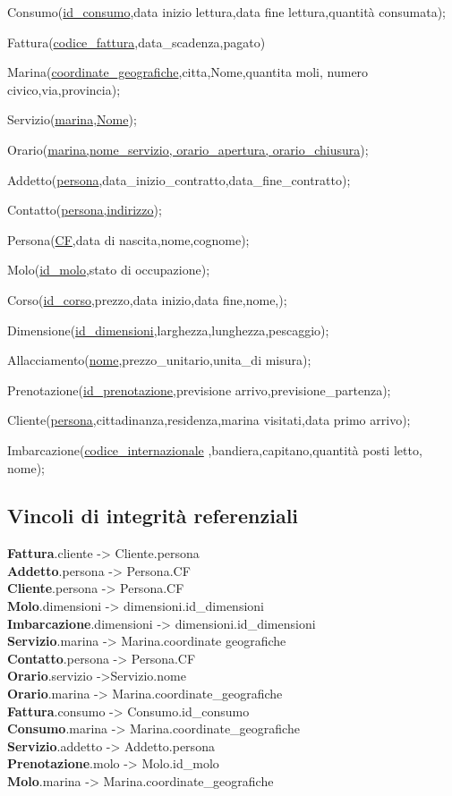 Consumo(\underline{id\_consumo},data inizio lettura,data fine lettura,quantità consumata);

Fattura(\underline{codice\_fattura},data\_scadenza,pagato) 

Marina(\underline{coordinate\_geografiche},citta,Nome,quantita moli, numero civico,via,provincia);

Servizio(\underline{marina,Nome});

Orario(\underline{marina,nome\_servizio, orario\_apertura, orario\_chiusura});

Addetto(\underline{persona},data\_inizio\_contratto,data\_fine\_contratto);

Contatto(\underline{persona,indirizzo});

Persona(\underline{CF},data di nascita,nome,cognome);

Molo(\underline{id\_molo},stato di occupazione);

Corso(\underline{id\_corso},prezzo,data inizio,data fine,nome,);

Dimensione(\underline{id\_dimensioni},larghezza,lunghezza,pescaggio);

Allacciamento(\underline{nome},prezzo\_unitario,unita\_di misura);

Prenotazione(\underline{id\_prenotazione},previsione arrivo,previsione\_partenza);

Cliente(\underline{persona},cittadinanza,residenza,marina visitati,data primo arrivo);

Imbarcazione(\underline{codice\_internazionale} ,bandiera,capitano,quantità posti letto, nome);


\subsection{Vincoli di integrità referenziali}

\textbf{Fattura}.cliente -> Cliente.persona\\
\textbf{Addetto}.persona -> Persona.CF\\
\textbf{Cliente}.persona -> Persona.CF\\
\textbf{Molo}.dimensioni -> dimensioni.id\_dimensioni\\
\textbf{Imbarcazione}.dimensioni -> dimensioni.id\_dimensioni\\
\textbf{Servizio}.marina -> Marina.coordinate geografiche\\
\textbf{Contatto}.persona -> Persona.CF\\
\textbf{Orario}.servizio ->Servizio.nome\\
\textbf{Orario}.marina -> Marina.coordinate\_geografiche\\
\textbf{Fattura}.consumo -> Consumo.id\_consumo\\
\textbf{Consumo}.marina -> Marina.coordinate\_geografiche\\
\textbf{Servizio}.addetto -> Addetto.persona\\
\textbf{Prenotazione}.molo -> Molo.id\_molo\\
\textbf{Molo}.marina -> Marina.coordinate\_geografiche\\
